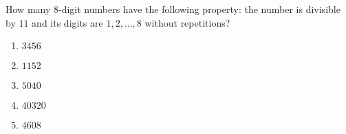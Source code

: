 How many $8$-digit numbers have the following property: the number is divisible by $11$ and its digits are $1,2,\ldots,8$ without repetitions?

\begin{enumerate}
\item $3456$
\item $1152$
\item $5040$
\item $40320$
\item $4608$
\end{enumerate}
